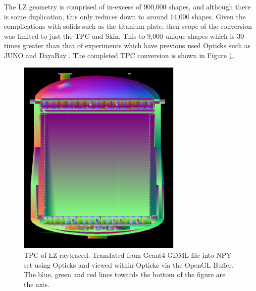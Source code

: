 \par
The LZ geometry is comprised of in-excess of 900,000 shapes, and although there is some duplication, this only reduces down to around 14,000 shapes.
Given the complications with solids such as the titanium plate, then scope of the conversion was limited to just the TPC and Skin.
This to 9,000 unique shapes which is 30-times greater than that of experiments which have previous used Opticks such as JUNO and DayaBay \cite{Opticks_CHEP_2021_ref}.
The completed TPC conversion is shown in Figure \ref{fig:OpticksLZTPC}.
\begin{figure}[!htbp]
\includegraphics[width=8cm]{Figures/Simulations/LZ_In_Opticks.png}
\centering
\caption{TPC of LZ raytraced. Translated from Geant4 GDML file into NPY set using Opticks and viewed within Opticks via the OpenGL Buffer.
The blue, green and red lines towards the bottom of the figure are the axis.}
\label{fig:OpticksLZTPC}
\end{figure}

